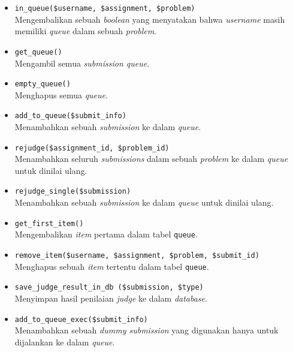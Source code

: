\documentclass[a4paper,twoside]{article}
\begin{document}
\begin{enumerate}
\begin{itemize}
\begin{itemize}
			                  \begin{itemize}
				                  \item \verb|in_queue($username, $assignment, $problem)| \\
				                        Mengembalikan sebuah \textit{boolean} yang menyatakan bahwa \textit{username} masih memiliki \textit{queue} dalam sebuah \textit{problem}.
				                  \item \verb|get_queue()| \\
				                        Mengambil semua \textit{submission queue}.
				                  \item \verb|empty_queue()| \\
				                        Menghapus semua \textit{queue}.
				                  \item \verb|add_to_queue($submit_info)| \\
				                        Menambahkan sebuah \textit{submission} ke dalam \textit{queue}.
				                  \item \verb|rejudge($assignment_id, $problem_id)| \\
				                        Menambahkan seluruh \textit{submissions} dalam sebuah \textit{problem} ke dalam \textit{queue} untuk dinilai ulang.
				                  \item \verb|rejudge_single($submission)| \\
				                        Menambahkan sebuah \textit{submission} ke dalam \textit{queue} untuk dinilai ulang.
				                  \item \verb|get_first_item()| \\
				                        Mengembalikan \textit{item} pertama dalam tabel \verb|queue|.
				                  \item \verb|remove_item($username, $assignment, $problem, $submit_id)| \\
				                        Menghapus sebuah \textit{item} tertentu dalam tabel \verb|queue|.
				                  \item \verb|save_judge_result_in_db ($submission, $type)| \\
				                        Menyimpan hasil penilaian \textit{judge} ke dalam \textit{database}.
				                  \item \verb|add_to_queue_exec($submit_info)| \\
				                        Menambahkan sebuah \textit{dummy submission} yang digunakan hanya untuk dijalankan ke dalam \textit{queue}.
			                  \end{itemize}


\end{itemize}
\end{itemize}
\end{enumerate}
\end{document}
